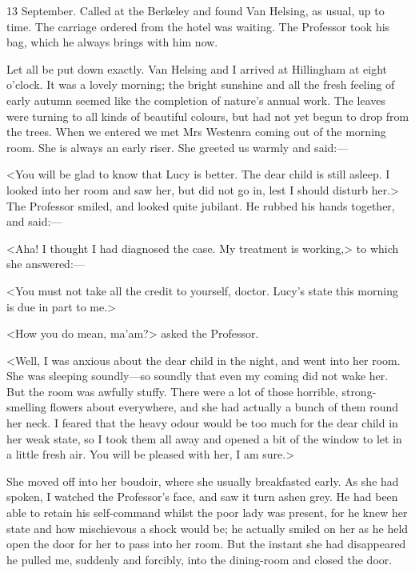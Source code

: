 \begin{diary}{13 September.}
Called at the Berkeley and found Van Helsing, as usual, up to time. The carriage ordered from the hotel was waiting. The Professor took his bag, which he always brings with him now.

Let all be put down exactly. Van Helsing and I arrived at Hillingham at eight o'clock. It was a lovely morning; the bright sunshine and all the fresh feeling of early autumn seemed like the completion of nature's annual work. The leaves were turning to all kinds of beautiful colours, but had not yet begun to drop from the trees. When we entered we met Mrs Westenra coming out of the morning room. She is always an early riser. She greeted us warmly and said:—

<You will be glad to know that Lucy is better. The dear child is still asleep. I looked into her room and saw her, but did not go in, lest I should disturb her.> The Professor smiled, and looked quite jubilant. He rubbed his hands together, and said:—

<Aha! I thought I had diagnosed the case. My treatment is working,> to which she answered:—

<You must not take all the credit to yourself, doctor. Lucy's state this morning is due in part to me.>

<How you do mean, ma'am?> asked the Professor.

<Well, I was anxious about the dear child in the night, and went into her room. She was sleeping soundly—so soundly that even my coming did not wake her. But the room was awfully stuffy. There were a lot of those horrible, strong-smelling flowers about everywhere, and she had actually a bunch of them round her neck. I feared that the heavy odour would be too much for the dear child in her weak state, so I took them all away and opened a bit of the window to let in a little fresh air. You will be pleased with her, I am sure.>

She moved off into her boudoir, where she usually breakfasted early. As she had spoken, I watched the Professor's face, and saw it turn ashen grey. He had been able to retain his self-command whilst the poor lady was present, for he knew her state and how mischievous a shock would be; he actually smiled on her as he held open the door for her to pass into her room. But the instant she had disappeared he pulled me, suddenly and forcibly, into the dining-room and closed the door.


\end{diary}
